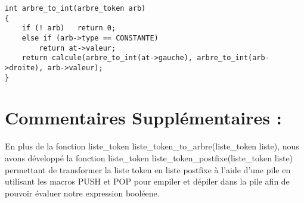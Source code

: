 \documentclass{article}
\begin{document}
\begin{verbatim}
int arbre_to_int(arbre_token arb)
{
    if (! arb)   return 0;
    else if (arb->type == CONSTANTE)
        return at->valeur;
    return calcule(arbre_to_int(at->gauche), arbre_to_int(arb->droite), arb->valeur);
}
\end{verbatim} 

\newpage
\section*{Commentaires Supplémentaires :}
En plus de la fonction liste\_token liste\_token\_to\_arbre(liste\_token liste), nous avons
développé la fonction liste\_token liste\_token\_postfixe(liste\_token liste) permettant de
transformer la liste token en liste postfixe à l'aide d'une pile en utilisant les macros PUSH et POP pour empiler et dépiler dans la pile afin de pouvoir évaluer notre expression booléene.
\end{document}
